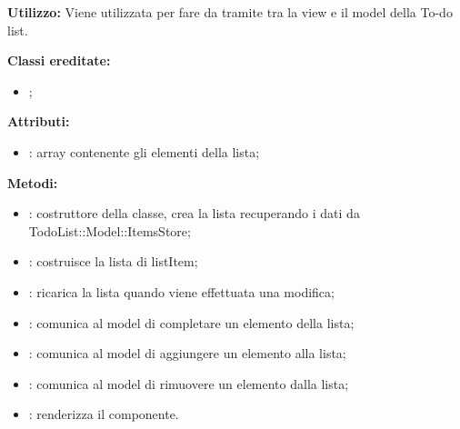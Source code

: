 \textbf{Utilizzo:}
Viene utilizzata per fare da tramite tra la view e il model della To-do list.

\textbf{Classi ereditate:}
\begin{itemize}
	\item {};
\end{itemize}

\textbf{Attributi:}
\begin{itemize}
	\item {}: array contenente gli elementi della lista;
\end{itemize}

\textbf{Metodi:}
\begin{itemize}
	\item {}: costruttore della classe, crea la lista recuperando i dati da TodoList::Model::ItemsStore;
	\item {}: costruisce la lista di listItem;
	\item {}: ricarica la lista quando viene effettuata una modifica;
	\item {}: comunica al model di completare un elemento della lista;
	\item {}: comunica al model di aggiungere un elemento alla lista;
	\item {}: comunica al model di rimuovere un elemento dalla lista;
	\item {}: renderizza il componente.
\end{itemize}
